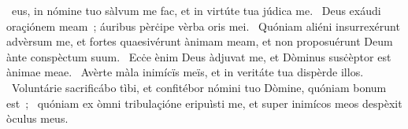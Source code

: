{  }
{%
~eus, in nómine tuo sàlvum me fac, et in virtúte tua júdica me. 
~Deus exáudi oraçiónem meam~; áuribus pèrċipe vèrba oris mei. 
~Quóniam aliéni insurrexérunt advèrsum me, et fortes quaesivérunt ànimam meam, et non proposuérunt Deum ànte conspèctum suum. 
~Ecċe ènim Deus àdjuvat me, et Dòminus susċèptor est ànimae meae. 
~Avèrte màla inimícïs meïs, et in veritáte tua dispèrde illos. 
~Voluntárie sacrificábo tìbi, et confitébor nómini tuo Dòmine, quóniam bonum est~; 
~quóniam ex òmni tribulaçióne eripuìsti me, et super inimícos meos despèxit òculus meus. 
}
